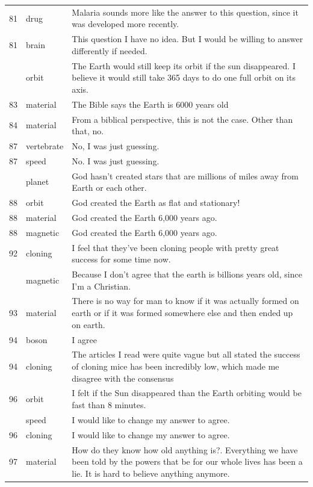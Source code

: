 \documentclass[
  doc,floatsintext]{apa6}
\begin{document}
\begin{longtable}[t]{>{}r>{}l>{\raggedright\arraybackslash}p{30em}}
81 & drug & Malaria sounds more like the answer to this question, since it was developed more recently.\\
81 & brain & This question I have no idea. But I would be willing to answer differently if needed.\\
\addlinespace
81 & orbit & The Earth would still keep its orbit if the sun disappeared. I believe it would still take 365 days to do one full orbit on its axis.\\
83 & material & The Bible says the Earth is 6000 years old\\
84 & material & From a biblical perspective, this is not the case. Other than that, no.\\
87 & vertebrate & No, I was just guessing.\\
87 & speed & No. I was just guessing.\\
\addlinespace
88 & planet & God hasn't created stars that are millions of miles away from Earth or each other.\\
88 & orbit & God created the Earth as flat and stationary!\\
88 & material & God created the Earth 6,000 years ago.\\
88 & magnetic & God created the Earth 6,000 years ago.\\
92 & cloning & I feel that they've been cloning people with pretty great success for some time now.\\
\addlinespace
92 & magnetic & Because I don't agree that the earth is billions years old, since I'm a Christian.\\
93 & material & There is no way for man to know if it was actually formed on earth or if it was formed somewhere else and then ended up on earth.\\
94 & boson & I agree\\
94 & cloning & The articles I read were quite vague but all stated the success of cloning mice has been incredibly low, which made me disagree with the consensus\\
96 & orbit & I felt if the Sun disappeared than the Earth orbiting would be fast than 8 minutes.\\
\addlinespace
96 & speed & I would like to change my answer to agree.\\
96 & cloning & I would like to change my answer to agree.\\
97 & material & How do they know how old anything is?.  Everything we have been told by the powers that be for our whole lives has been a lie.  It is hard to believe anything anymore.\\

\end{longtable}
\end{document}
